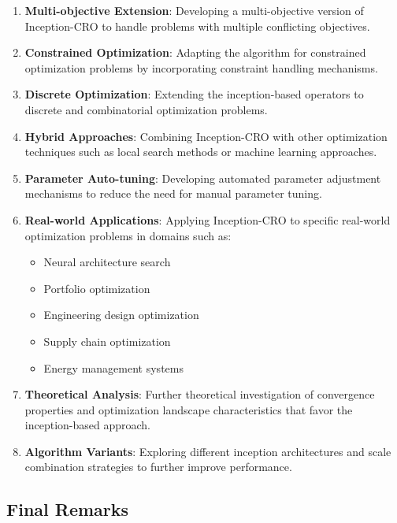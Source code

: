 \begin{enumerate}
    \item \textbf{Multi-objective Extension}: Developing a multi-objective version of Inception-CRO to handle problems with multiple conflicting objectives.
    
    \item \textbf{Constrained Optimization}: Adapting the algorithm for constrained optimization problems by incorporating constraint handling mechanisms.
    
    \item \textbf{Discrete Optimization}: Extending the inception-based operators to discrete and combinatorial optimization problems.
    
    \item \textbf{Hybrid Approaches}: Combining Inception-CRO with other optimization techniques such as local search methods or machine learning approaches.
    
    \item \textbf{Parameter Auto-tuning}: Developing automated parameter adjustment mechanisms to reduce the need for manual parameter tuning.
    
    \item \textbf{Real-world Applications}: Applying Inception-CRO to specific real-world optimization problems in domains such as:
    \begin{itemize}
        \item Neural architecture search
        \item Portfolio optimization
        \item Engineering design optimization
        \item Supply chain optimization
        \item Energy management systems
    \end{itemize}
    
    \item \textbf{Theoretical Analysis}: Further theoretical investigation of convergence properties and optimization landscape characteristics that favor the inception-based approach.
    
    \item \textbf{Algorithm Variants}: Exploring different inception architectures and scale combination strategies to further improve performance.
\end{enumerate}

\subsection{Final Remarks}

